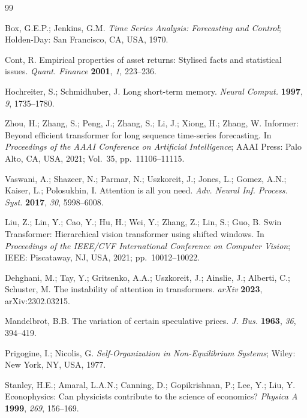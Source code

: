 \documentclass[11pt,a4paper]{article}  %
\theoremstyle{plain}
\theoremstyle{definition}
\theoremstyle{remark}
\begin{document}
\begin{thebibliography}{99}

Box, G.E.P.; Jenkins, G.M. \textit{Time Series Analysis: Forecasting
and Control}; Holden-Day: San Francisco, CA, USA, 1970.

Cont, R. Empirical properties of asset returns: Stylised facts and
statistical issues. \textit{Quant. Finance} \textbf{2001}, \textit{1},
223--236.

Hochreiter, S.; Schmidhuber, J. Long short-term memory.
\textit{Neural Comput.} \textbf{1997}, \textit{9}, 1735--1780.

Zhou, H.; Zhang, S.; Peng, J.; Zhang, S.; Li, J.; Xiong, H.; Zhang, W.
Informer: Beyond efficient transformer for long sequence time-series
forecasting. In \textit{Proceedings of the AAAI Conference on Artificial
Intelligence}; AAAI Press: Palo Alto, CA, USA, 2021; Vol.~35,
pp.~11106--11115.

Vaswani, A.; Shazeer, N.; Parmar, N.; Uszkoreit, J.; Jones, L.;
Gomez, A.N.; Kaiser, L.; Polosukhin, I. Attention is all you need.
\textit{Adv. Neural Inf. Process. Syst.} \textbf{2017}, \textit{30},
5998--6008.

Liu, Z.; Lin, Y.; Cao, Y.; Hu, H.; Wei, Y.; Zhang, Z.; Lin, S.;
Guo, B. Swin Transformer: Hierarchical vision transformer using shifted
windows. In \textit{Proceedings of the IEEE/CVF International Conference
on Computer Vision}; IEEE: Piscataway, NJ, USA, 2021; pp.~10012--10022.

Dehghani, M.; Tay, Y.; Gritsenko, A.A.; Uszkoreit, J.; Ainslie, J.;
Alberti, C.; Schuster, M. The instability of attention in transformers.
\textit{arXiv} \textbf{2023}, arXiv:2302.03215.

Mandelbrot, B.B. The variation of certain speculative prices.
\textit{J. Bus.} \textbf{1963}, \textit{36}, 394--419.

Prigogine, I.; Nicolis, G. \textit{Self-Organization in Non-Equilibrium
Systems}; Wiley: New York, NY, USA, 1977.

Stanley, H.E.; Amaral, L.A.N.; Canning, D.; Gopikrishnan, P.; Lee, Y.;
Liu, Y. Econophysics: Can physicists contribute to the science of
economics? \textit{Physica A} \textbf{1999}, \textit{269}, 156--169.


\end{thebibliography}
\end{document}

